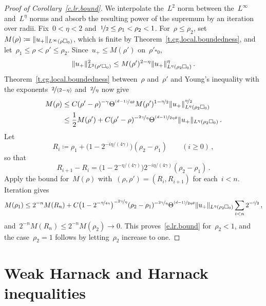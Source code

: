 \documentclass[11pt,letterpaper]{article}
\numberwithin{equation}{section}
\theoremstyle{definition}
\newcommand{\nf}{\nicefrac}
\newcommand{\cu}{\square}
\DeclarePairedDelimiter{\norm}{\lVert}{\rVert}
\begin{document}
\begin{proof}[Proof of Corollary~\ref{c.lr.bound}]
We interpolate the~$L^2$ norm between the~$L^\infty$ and~$L^\eta$ norms and absorb the resulting power of the supremum by an iteration over radii. Fix~$0<\eta<2$ and~$\nf12\leq\rho_1<\rho_2<1$. For~$\rho\leq\rho_2$, set~$M(\rho)\coloneqq\norm{u_+}_{L^\infty(\rho\cu_0)}$, which is finite by Theorem~\ref{t.cg.local.boundedness}, and let~$\rho_1\leq\rho<\rho'\leq\rho_2$. Since~$u_+\leq M(\rho')$ on~$\rho'\cu_0$,
\begin{equation*}
	\norm{u_+}_{L^2(\rho'\cu_0)}^2\leq M(\rho')^{2-\eta}\norm{u_+}_{L^\eta(\rho_2\cu_0)}^\eta\,.
\end{equation*}
Theorem~\ref{t.cg.local.boundedness} between~$\rho$ and~$\rho'$ and Young's inequality with the exponents~$\nf2{(2-\eta)}$ and~$\nf2\eta$ now give
\begin{align*}
	M(\rho)&\leq C(\rho'-\rho)^{-\gamma}\Theta^{\nf{(d-1)}{4\theta}}M(\rho')^{1-\nf\eta2}\norm{u_+}_{L^\eta(\rho_2\cu_0)}^{\nf\eta2}\\
	&\leq\frac12M(\rho')+C(\rho'-\rho)^{-\nf{2\gamma}\eta}\Theta^{\nf{(d-1)}{2\eta\theta}}\norm{u_+}_{L^\eta(\rho_2\cu_0)}\,.
\end{align*}
Let
\begin{equation*}
	R_i\coloneqq\rho_1+\bigl(1-2^{-i\eta/(4\gamma)}\bigr)(\rho_2-\rho_1)\qquad(i\geq0)\,,
\end{equation*}
so that
\begin{equation*}
	R_{i+1}-R_i=\bigl(1-2^{-\eta/(4\gamma)}\bigr)2^{-i\eta/(4\gamma)}(\rho_2-\rho_1)\,.
\end{equation*}
Apply the bound for~$M(\rho)$ with~$(\rho,\rho')=(R_i,R_{i+1})$ for each~$i<n$. Iteration gives
\begin{equation*}
	M(\rho_1)\leq2^{-n}M(R_n)+C\bigl(1-2^{-\nf\eta{4\gamma}}\bigr)^{-\nf{2\gamma}\eta}(\rho_2-\rho_1)^{-\nf{2\gamma}\eta}\Theta^{\nf{(d-1)}{2\eta\theta}}\norm{u_+}_{L^\eta(\rho_2\cu_0)}\sum_{i<n}2^{-\nf i2}\,,
\end{equation*}
and~$2^{-n}M(R_n)\leq2^{-n}M(\rho_2)\to0$. This proves~\eqref{e.lr.bound} for~$\rho_2<1$, and the case~$\rho_2=1$ follows by letting~$\rho_2$ increase to one.
\end{proof}

\section{Weak Harnack and Harnack inequalities}
\label{s.harnack}
\end{document}
